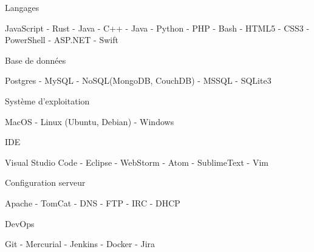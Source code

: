 \begin{cventries}
  \cventry
    {Langages}
    {}
    {}
    {}
    {
      \begin{cvitems}
        \item {JavaScript - Rust - Java - C++ - Java - Python - PHP - Bash - HTML5 - CSS3 - PowerShell - ASP.NET -  Swift }
      \end{cvitems}
    }
    
    \cventry
    {Base de données}
    {}
    {}
    {}
    {
      \begin{cvitems}
        \item {Postgres - MySQL - NoSQL(MongoDB, CouchDB) -  MSSQL - SQLite3}
      \end{cvitems}
    }
    
    \cventry
    {Système d'exploitation}
    {}
    {}
    {}
    {
      \begin{cvitems}
        \item {MacOS - Linux (Ubuntu, Debian) - Windows}
      \end{cvitems}
    }
    
    \cventry
    {IDE}
    {}
    {}
    {}
    {
      \begin{cvitems}
        \item {Visual Studio Code - Eclipse - WebStorm - Atom - SublimeText - Vim}
      \end{cvitems}
    }
    
    \cventry
    {Configuration serveur}
    {}
    {}
    {}
    {
      \begin{cvitems}
        \item {Apache - TomCat - DNS - FTP - IRC - DHCP}
      \end{cvitems}
    }
    
    \cventry
    {DevOps}
    {}
    {}
    {}
    {
      \begin{cvitems}
        \item {Git - Mercurial - Jenkins - Docker - Jira}
      \end{cvitems}
    }
\end{cventries}